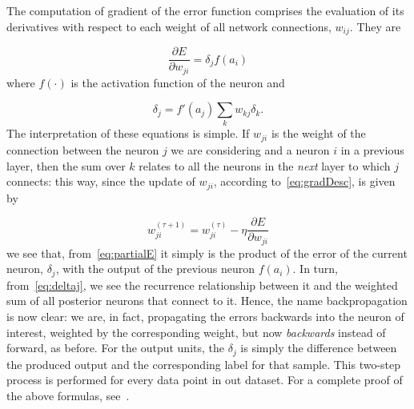 The computation of gradient of the error function comprises the evaluation of its derivatives with respect to each weight of all network connections, $w_{ij}$. They are

\begin{equation}\label{eq:partialE}
	\frac{\partial E}{\partial w_{ji}} = \delta_j f(a_i)
\end{equation}
where $f(\cdot)$ is the activation function of the neuron and

\begin{equation}\label{eq:deltaj}
	\delta_j = f'(a_j) \sum_k w_{kj} \delta_k .
\end{equation}
The interpretation of these equations is simple. If $w_{ji}$ is the weight of the connection between the neuron $j$ we are considering and a neuron $i$ in a previous layer, then the sum over $k$ relates to all the neurons in the \emph{next} layer to which $j$ connects: this way, since the update of $w_{ji}$, according to~\ref{eq:gradDesc}, is given by

\begin{equation}\label{eq:update}
	w_{ji}^{(\tau+1)} = w_{ji}^{(\tau)} - \eta \frac{\partial E}{\partial w_{ji}}
\end{equation}
we see that, from~\ref{eq:partialE}  it simply is the product of the error of the current neuron, $\delta_j$, with the output of the previous neuron $f(a_i)$. In turn, from~\ref{eq:deltaj}, we see the recurrence relationship between it and the weighted sum of all posterior neurons that connect to it. Hence, the name backpropagation is now clear: we are, in fact, propagating the errors backwards into the neuron of interest, weighted by the corresponding weight, but now \emph{backwards} instead of forward, as before. For the output units, the $\delta_j$ is simply the difference between the produced output and the corresponding label for that sample. This two-step process is performed for every data point in out dataset. %
For a complete proof of the above formulas, see~\cite[chap. 5.3.1]{Bishop2006}.

